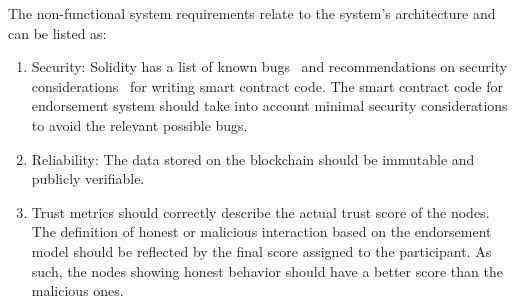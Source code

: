 The non-functional system requirements relate to the system's architecture and
can be listed as:
\begin{enumerate}
	\item Security: Solidity has a list of known bugs~\cite{soliditySecurity}
		and recommendations on security considerations~\cite{solidityBugs} for
		writing smart contract code. The smart contract code for endorsement
		system should take into account minimal security considerations to
		avoid the relevant possible bugs. 
	\item Reliability: The data stored on the blockchain should be immutable
		and publicly verifiable.
	\item Trust metrics should correctly describe the actual trust score of the
		nodes.  \newline
		The definition of honest or malicious interaction based on the
		endorsement model should be reflected by the final score assigned to
		the participant. As such, the nodes showing honest behavior should have
		a better score than the malicious ones.   
\end{enumerate}

